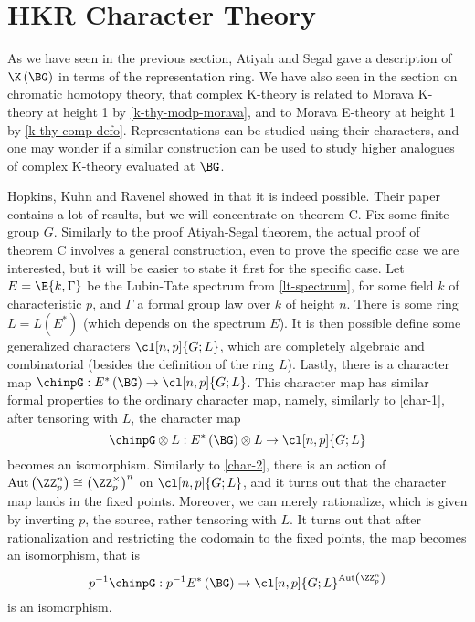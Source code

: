\section{HKR Character Theory}

As we have seen in the previous section, Atiyah and Segal gave a description of $\K\left(\BG\right)$ in terms of the representation ring.
We have also seen in the section on chromatic homotopy theory, that complex K-theory is related to Morava K-theory at height 1 by \ref{k-thy-modp-morava}, and to Morava E-theory at height 1 by \ref{k-thy-comp-defo}.
Representations can be studied using their characters, and one may wonder if a similar construction can be used to study higher analogues of complex K-theory evaluated at $\BG$.

Hopkins, Kuhn and Ravenel showed in \cite{HKR} that it is indeed possible.
Their paper contains a lot of results, but we will concentrate on theorem C.
Fix some finite group $G$.
Similarly to the proof Atiyah-Segal theorem, the actual proof of theorem C involves a general construction, even to prove the specific case we are interested, but it will be easier to state it first for the specific case.
Let $E = \E{k, \Gamma}$ be the Lubin-Tate spectrum from \ref{lt-spectrum}, for some field $k$ of characteristic $p$, and $\Gamma$ a formal group law over $k$ of height $n$. 
There is some ring $L = L\left(E^*\right)$ (which depends on the spectrum $E$).
It is then possible define some generalized characters $\cl[n,p]{G; L}$, which are completely algebraic and combinatorial (besides the definition of the ring $L$).
Lastly, there is a character map $\chinpG: E^*\left(\BG\right) \to \cl[n,p]{G; L}$.
This character map has similar formal properties to the ordinary character map, namely, similarly to \ref{char-1}, after tensoring with $L$, the character map
$$
\chinpG \otimes L:
E^*\left(\BG\right) \otimes L
\to \cl[n,p]{G; L}
$$
becomes an isomorphism.
Similarly to \ref{char-2}, there is an action of $\aut\left(\ZZ_p^n\right) \cong \left(\ZZ_p^\times\right)^n$ on $\cl[n,p]{G; L}$, and it turns out that the character map lands in the fixed points.
Moreover, we can merely rationalize, which is given by inverting $p$, the source, rather tensoring with $L$.
It turns out that after rationalization and restricting the codomain to the fixed points, the map becomes an isomorphism, that is
$$
p^{-1} \chinpG:
p^{-1} E^*\left(\BG\right)
\to \cl[n,p]{G; L}^{\aut\left(\ZZ_p^n\right)}
$$
is an isomorphism.

